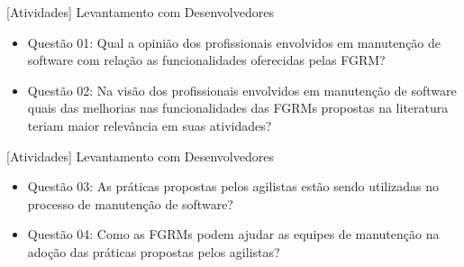 \documentclass[t,14pt,mathserif]{beamer}
\begin{document}
\begin{frame}{[Atividades] Levantamento com Desenvolvedores}

    \begin{itemize}
        \item Questão 01: Qual a opinião dos profissionais envolvidos em
            manutenção de software com relação as funcionalidades
            oferecidas pelas FGRM\@?
        \item Questão 02: Na visão dos profissionais envolvidos em
            manutenção de software quais das melhorias nas
            funcionalidades das FGRMs propostas na literatura teriam
            maior relevância em suas atividades?
    \end{itemize}

\end{frame}

\begin{frame}{[Atividades] Levantamento com Desenvolvedores}

    \begin{itemize}
        \item Questão 03: As práticas propostas pelos agilistas estão
            sendo utilizadas no processo de manutenção de software?
        \item Questão 04: Como as FGRMs podem ajudar as equipes de
            manutenção na adoção das práticas propostas pelos agilistas?
    \end{itemize}

\end{frame}
\end{document}
